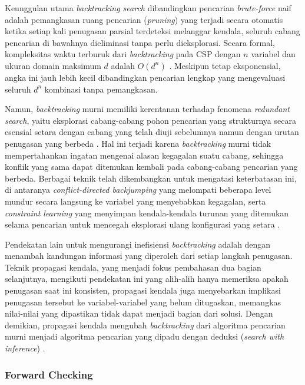 Keunggulan utama \textit{backtracking search} dibandingkan pencarian \textit{brute-force} naif adalah pemangkasan ruang pencarian (\textit{pruning}) yang terjadi secara otomatis ketika setiap kali penugasan parsial terdeteksi melanggar kendala, seluruh cabang pencarian di bawahnya dieliminasi tanpa perlu dieksplorasi. Secara formal, kompleksitas waktu terburuk dari \textit{backtracking} pada CSP dengan $n$ variabel dan ukuran domain maksimum $d$ adalah $O(d^n)$ \cite{kumar1998}. Meskipun tetap eksponensial, angka ini jauh lebih kecil dibandingkan pencarian lengkap yang mengevaluasi seluruh $d^n$ kombinasi tanpa pemangkasan.

Namun, \textit{backtracking} murni memiliki kerentanan terhadap fenomena \textit{redundant search}, yaitu eksplorasi cabang-cabang pohon pencarian yang strukturnya secara esensial setara dengan cabang yang telah diuji sebelumnya namun dengan urutan penugasan yang berbeda \cite{kumar1998}. Hal ini terjadi karena \textit{backtracking} murni tidak mempertahankan ingatan mengenai alasan kegagalan suatu cabang, sehingga konflik yang sama dapat ditemukan kembali pada cabang-cabang pencarian yang berbeda. Berbagai teknik telah dikembangkan untuk mengatasi keterbatasan ini, di antaranya \textit{conflict-directed backjumping} yang melompati beberapa level mundur secara langsung ke variabel yang menyebabkan kegagalan, serta \textit{constraint learning} yang menyimpan kendala-kendala turunan yang ditemukan selama pencarian untuk mencegah eksplorasi ulang konfigurasi yang setara \cite{kumar1998}.

Pendekatan lain untuk mengurangi inefisiensi \textit{backtracking} adalah dengan menambah kandungan informasi yang diperoleh dari setiap langkah penugasan. Teknik propagasi kendala, yang menjadi fokus pembahasan dua bagian selanjutnya, mengikuti pendekatan ini yang alih-alih hanya memeriksa apakah penugasan saat ini konsisten, propagasi kendala juga menyebarkan implikasi penugasan tersebut ke variabel-variabel yang belum ditugaskan, memangkas nilai-nilai yang dipastikan tidak dapat menjadi bagian dari solusi. Dengan demikian, propagasi kendala mengubah \textit{backtracking} dari algoritma pencarian murni menjadi algoritma pencarian yang dipadu dengan deduksi (\textit{search with inference}) \cite{van2006backtracking}.

\subsubsection{Forward Checking}
\label{subsubsec:forward-checking}

